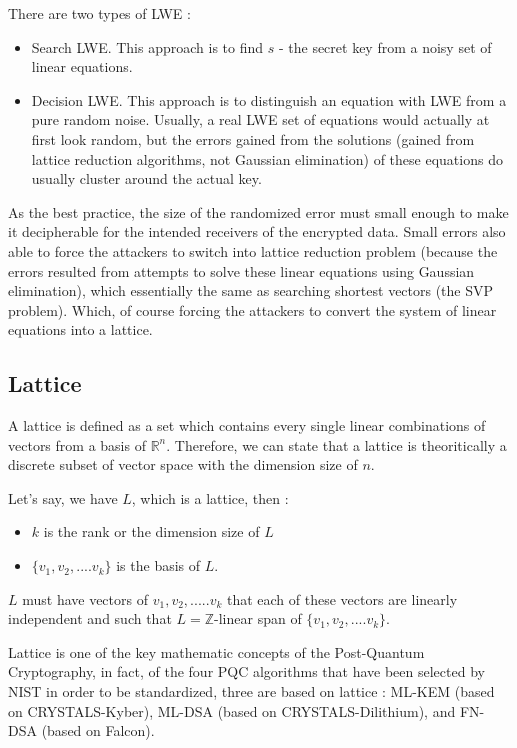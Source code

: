 \documentclass[runningheads]{llncs}
\begin{document}
There are two types of LWE : 
\begin{itemize}
\raggedright
\item Search LWE. This approach is to find $s$ - the secret key from a noisy set of linear equations. 

\item Decision LWE. This approach is to distinguish an equation with LWE from a pure random noise. Usually, a real LWE set of equations would actually at first look random, but the errors gained from the solutions (gained from lattice reduction algorithms, not Gaussian elimination) of these equations do usually cluster around the actual key. 
\end{itemize}

As the best practice, the size of the randomized error must small enough to make it decipherable for the intended receivers of the encrypted data. Small errors also able to force the attackers to switch into lattice reduction problem (because the errors resulted from attempts to solve these linear equations using Gaussian elimination), which essentially the same as searching shortest vectors (the SVP problem). Which, of course forcing the attackers to convert the system of linear equations into a lattice. 

\subsection{Lattice}
\mbox{}
A lattice is defined as a set which contains every single linear combinations of vectors from a basis of $\mathbb{R}^n$. Therefore, we can state that a lattice is theoritically a discrete subset of vector space with the dimension size of $n$. 

Let's say, we have $L$, which is a lattice, then :
\begin{itemize}
\raggedright
\item $k$ is the rank or the dimension size of $L$
\item ${\{v_1, v_2, ....v_k\}}$ is the basis of $L$.
\end{itemize}

$L$ must have vectors of $v_1, v_2, .....v_k$ that each of these vectors are linearly independent and such that $L = \mathbb{Z}$-linear span of ${\{v_1, v_2, ....v_k\}}$\cite{12}.

Lattice is one of the key mathematic concepts of the Post-Quantum Cryptography, in fact, of the four PQC algorithms that have been selected by NIST in order to be standardized, three are based on lattice : ML-KEM (based on CRYSTALS-Kyber), ML-DSA (based on CRYSTALS-Dilithium), and FN-DSA (based on Falcon). 
\end{document}
